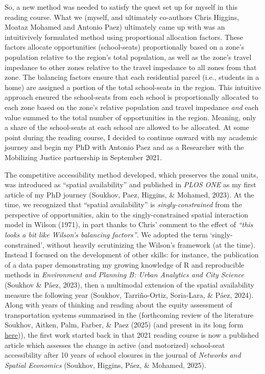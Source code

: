 \documentclass[
11pt, %
oneside, %
english, %
singlespacing, %
]{macthesis} %
\begin{document}
So, a new method was needed to satisfy the quest set up for myself in this reading course. What we (myself, and ultimately co-authors Chris Higgins, Moataz Mohamed and Antonio Paez) ultimately came up with was an intuitivively formulated method using proportional allocation factors. These factors allocate opportunities (school-seats) proportionally based on a zone's population relative to the region's total population, as well as the zone's travel impedance to other zones relative to the travel impedance to all zones from that zone. The balancing factors ensure that each residential parcel (i.e., students in a home) are assigned a portion of the total school-seats in the region. This intuitive approach ensured the school-seats from each school is proportionally allocated to each zone based on the zone's relative population and travel impedance \emph{and} each value summed to the total number of opportunities in the region. Meaning, only a share of the school-seats at each school are allowed to be allocated. At some point during the reading course, I decided to continue onward with my academic journey and begin my PhD with Antonio Paez and as a Researcher with the Mobilizing Justice partnership in September 2021.

The competitive accessibility method developed, which preserves the zonal units, was introduced as ``spatial availability'' and published in \emph{PLOS ONE} as my first article of my PhD journey (Soukhov, Paez, Higgins, \& Mohamed, 2023). At the time, we recognized that ``spatial availability'' is \emph{singly-constrained} from the perspective of opportunities, akin to the singly-constrained spatial interaction model in Wilson (1971), in part thanks to Chris' comment to the effect of \emph{``this looks a bit like Wilson's balancing factors''}. We adopted the term `singly-constrained', without heavily scrutinizing the Wilson's framework (at the time). Instead I focused on the development of other skills: for instance, the publication of a data paper demonstrating my growing knowledge of R and reproducible methods in \emph{Environment and Planning B: Urban Analytics and City Science} (Soukhov \& Páez, 2023), then a multimodal extension of the spatial availability measure the following year (Soukhov, Tarriño-Ortiz, Soria-Lara, \& Páez, 2024). Along with years of thinking and reading about the equity assessment of transportation systems summarised in the (forthcoming review of the literature Soukhov, Aitken, Palm, Farber, \& Paez (2025) (and present in its long form \href{https://mobilizingjustice.ca/wp-content/uploads/2024/01/just-transportation-1.pdf}{here})), the first work started back in that 2021 reading course is now a published article which assesses the change in active (and motorized) school-seat accessibility after 10 years of school closures in the journal of \emph{Networks and Spatial Economics} (Soukhov, Higgins, Páez, \& Mohamed, 2025).
\end{document}
